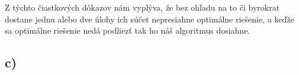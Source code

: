 \documentclass[a4paper]{article}
\begin{document}
Z týchto čiastkových dôkazov nám vyplýva, že bez ohľadu na to či byrokrat dostane jednu alebo dve úlohy ich súčet nepresiahne optimálne riešenie, a keďže sa optimálne riešenie nedá podliezť tak ho náš algoritmus dosiahne.

\subsection*{c)}

\end{document}
